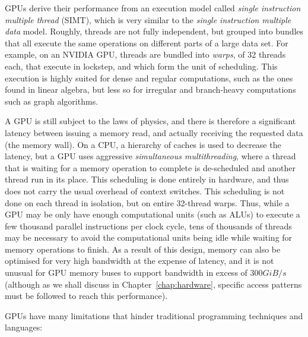 GPUs derive their performance from an execution model called
\textit{single instruction multiple thread} (SIMT), which is very
similar to the \textit{single instruction multiple data} model.
Roughly, threads are not fully independent, but grouped into bundles
that all execute the same operations on different parts of a large
data set.  For example, on an NVIDIA GPU, threads are bundled into
\textit{warps}, of 32 threads each, that execute in lockstep, and
which form the unit of scheduling.  This execution is highly suited
for dense and regular computations, such as the ones found in linear
algebra, but less so for irregular and branch-heavy computations such
as graph algorithms.

A GPU is still subject to the laws of physics, and there is therefore
a significant latency between issuing a memory read, and actually
receiving the requested data (the memory wall).  On a CPU, a hierarchy
of caches is used to decrease the latency, but a GPU uses aggressive
\textit{simultaneous multithreading}, where a thread that is waiting
for a memory operation to complete is de-scheduled and another thread
run in its place.  This scheduling is done entirely in hardware, and
thus does not carry the usual overhead of context switches.  This
scheduling is not done on each thread in isolation, but on entire
32-thread warps.  Thus, while a GPU may be only have enough
computational units (such as ALUs) to execute a few thousand parallel
instructions per clock cycle, tens of thousands of threads may be
necessary to avoid the computational units being idle while waiting
for memory operations to finish.  As a result of this design, memory
can also be optimised for very high bandwidth at the expense of
latency, and it is not unusual for GPU memory buses to support
bandwidth in excess of $300GiB/s$ (although as we shall discuss in
Chapter~\ref{chap:hardware}, specific access patterns must be followed
to reach this performance).

GPUs have many limitations that hinder traditional programming
techniques and languages:

